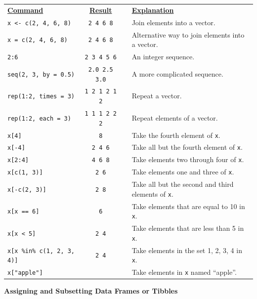\documentclass[11pt]{article}
\begin{document}
\begin{longtable}{lcll}
	\underline{\bf Command} & \underline{\bf Result} & & \underline{\bf Explanation}\\
	\texttt{x <- c(2, 4, 6, 8)} & \texttt{2 4 6 8}  && Join elements into a vector.\\
	\texttt{x = c(2, 4, 6, 8)} & \texttt{2 4 6 8} &&  Alternative way to join elements into a vector.\\
	\texttt{2:6} & \texttt{2 3 4 5 6} & & An integer sequence.\\
	\texttt{seq(2, 3, by = 0.5)} & \texttt{2.0 2.5 3.0} && A more complicated sequence.\\
	\texttt{rep(1:2, times = 3)} & \texttt{1 2 1 2 1 2} && Repeat a vector.\\
	\texttt{rep(1:2, each = 3)} & \texttt{1 1 1 2 2 2} && Repeat elements of a vector.\\
	\texttt{x[4]} & \texttt{8} && Take the fourth element of \texttt{x}.\\
	\texttt{x[-4]} & \texttt{2 4 6} && Take all but the fourth element of \texttt{x}.\\
	\texttt{x[2:4]} & \texttt{4 6 8} && Take elements two through four of \texttt{x}.\\
	\texttt{x[c(1, 3)]} & \texttt{2 6} && Take elements one and three of \texttt{x}.\\
	\texttt{x[-c(2, 3)]} & \texttt{2 8} && Take all but the second and third elements of \texttt{x}.\\
	\texttt{x[x == 6]} & \texttt{6} && Take elements that are equal to 10 in \texttt{x}.\\
	\texttt{x[x < 5]} & \texttt{2 4} && Take elements that are less than 5 in \texttt{x}.\\
	\texttt{x[x \%in\% c(1, 2, 3, 4)]} & \texttt{2 4} && Take elements in the set 1, 2, 3, 4 in \texttt{x}.\\
	\texttt{x["apple"]} &  && Take elements in \texttt{x} named ``apple''.
\end{longtable}


\begin{tcolorbox}[width=4.4in, sharp corners=all, colback=white!95!black] %
	{\bf Assigning and Subsetting Data Frames or Tibbles}
\end{tcolorbox}
\end{document}
